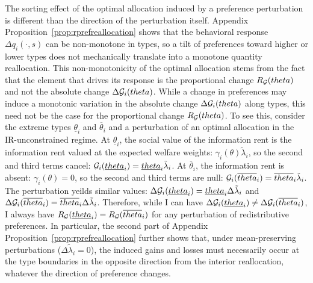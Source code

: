 \documentclass{class}
\begin{document}
The sorting effect of the optimal allocation induced by a preference perturbation is different than the direction of the perturbation itself. Appendix Proposition~\ref{prop:rprefreallocation} shows that the behavioral response $\Delta q_i(\cdot,s)$ can be non-monotone in types, so a tilt of preferences toward higher or lower types does not mechanically translate into a monotone quantity reallocation. This non-monotonicity of the optimal allocation stems from the fact that the element that drives its response is the proportional change $R_{\mathcal{G}}(theta)$ and not the absolute change $\Delta \mathcal{G}_i(theta)$. While a change in preferences may induce a monotonic variation in the absolute change $\Delta \mathcal{G}_i(theta)$ along types, this need not be the case for the proportional change $R_{\mathcal{G}}(theta)$. To see this, consider the extreme types $\underline{\theta}_i$ and $\overline{\theta}_i$ and a perturbation of an optimal allocation in the IR-unconstrained regime. At $\underline{\theta}_i$, the social value of the information rent is the information rent valued at the expected welfare weights: $\gamma_i(\theta)\tilde\lambda_i$, so the second and third terms cancel: $\mathcal{G}_i( \underline{theta}_i)= \underline{theta}_i  \tilde\lambda_i$. At $\overline{\theta}_i$, the information rent is absent: $\gamma_i(\theta)=0$, so the second and third terms are null: $\mathcal{G}_i(\overline{theta}_i)= \overline{theta}_i  \tilde\lambda_i$. The perturbation yeilds similar values:  $\Delta \mathcal{G}_i( \underline{theta}_i)= \underline{theta}_i  \Delta \tilde\lambda_i$ and $\Delta \mathcal{G}_i(\overline{theta}_i)= \overline{theta}_i  \Delta \tilde\lambda_i$. Therefore, while I can have $\Delta \mathcal{G}_i(\underline{theta}_i) \neq \Delta \mathcal{G}_i(\overline{theta}_i)$, I always have $R_{\mathcal{G}}(\underline{theta}_i) = R_{\mathcal{G}}(\overline{theta}_i)$ for any perturbation of redistributive preferences. In particular, the second part of Appendix Proposition~\ref{prop:rprefreallocation} further shows that, under mean-preserving perturbations ($\Delta \tilde\lambda_i=0$), the induced gains and losses must necessarily occur at the type boundaries in the opposite direction from the interior reallocation, whatever the direction of preference changes.
\end{document}
